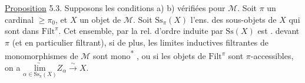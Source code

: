 \uline{Proposition} 5.3. Supposons les conditions
a) b)   vérifiées pour $\mathcal M$. Soit
$\pi$ un cardinal $\geq\pi_0$, et $X$ un objet
de $\mathcal M$.  Soit $\mathrm{Ss}_{\pi}(X)$ l'ens.
des sous-objets de $X$ qui sont dans $\mathrm{Filt}^{\pi}$.
Cet ensemble,  par la rel. d'ordre
induite par $\mathrm{Ss}(X)$ est .
 devant $\pi$ (et en particulier filtrant),
 si de plus, les limites
inductives filtrantes de monomorphismes
de $\mathcal M$ sont mono\textsuperscript{*} , ou si les objets de $\mathrm{Filt}^{\pi}$
sont $\pi$-accessibles, on a
$\underset{\alpha\in\mathrm{Ss}_{\pi}(X)}{\underrightarrow{\mathrm{lim}}} Z_{\alpha}\overset{\sim}{\longrightarrow} X$.


